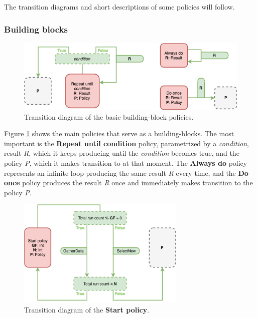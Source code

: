 The transition diagrams and short descriptions of some policies will follow.

\subsubsection{Building blocks}

\begin{figure}[h!]
	\captionsetup{justification=centering,margin=0.5cm}
	\centerline{\mbox{\includegraphics[width=130mm]{./img/helper_policies.png}}}
	\caption{Transition diagram of the basic building-block policies.}
	\label{fig:helper_policies}
\end{figure}

Figure \ref{fig:helper_policies} shows the main policies that serve as a building-blocks. The most important is the \textbf{Repeat until condition} policy, parametrized by a \textit{condition}, result \textit{R}, which it keeps producing until the \textit{condition} becomes true, and the policy \textit{P}, which it makes transition to at that moment. The \textbf{Always do} policy represents an infinite loop producing the same result \textit{R} every time, and the \textbf{Do once} policy produces the result \textit{R} once and immediately makes transition to the policy \textit{P}.

\begin{figure}[h!]
	\captionsetup{justification=centering,margin=0.5cm}
	\centerline{\mbox{\includegraphics[width=80mm]{./img/start_policy.png}}}
	\caption{Transition diagram of the \textbf{Start policy}.}
	\label{fig:start_policy}
\end{figure}

